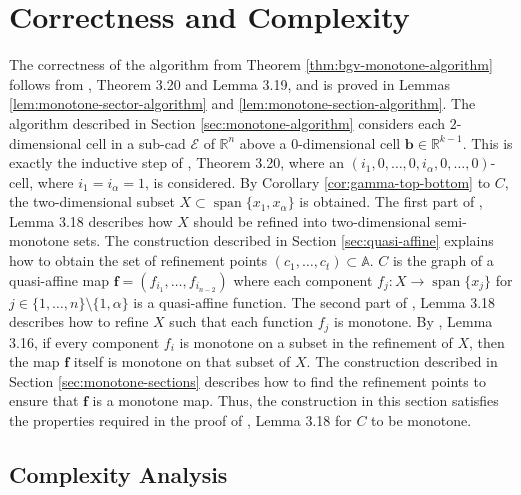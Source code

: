 \documentclass[
]{book}
\theoremstyle{definition}
\theoremstyle{definition}
\theoremstyle{definition}
\theoremstyle{definition}
\theoremstyle{remark}
\begin{document}
\hypertarget{correctness-and-complexity-1}{%
\section{Correctness and Complexity}\label{correctness-and-complexity-1}}

The correctness of the algorithm from Theorem \ref{thm:bgv-monotone-algorithm} follows from \citet{bgv15}, Theorem 3.20 and
Lemma 3.19, and is proved in Lemmas \ref{lem:monotone-sector-algorithm} and \ref{lem:monotone-section-algorithm}.
The algorithm described in Section \ref{sec:monotone-algorithm} considers each \(2\)-dimensional cell in a sub-cad \(\mathcal{E}\) of \(\mathbb{R}^n\) above a \(0\)-dimensional cell \(\mathbf{b} \in \mathbb{R}^{k-1}\). This is exactly the inductive step of \citet{bgv15}, Theorem 3.20, where an \((i_1,0,\ldots,0,i_{\alpha},0,\ldots,0)\)-cell, where \(i_1 = i_\alpha = 1\), is considered.
By Corollary \ref{cor:gamma-top-bottom} to \(C\), the two-dimensional subset \(X \subset {\operatorname{span} \{x_1,x_\alpha\}}\) is obtained. The first part of \citet{bgv15}, Lemma 3.18 describes how \(X\) should be refined into two-dimensional semi-monotone sets. The construction described in Section \ref{sec:quasi-affine} explains how to obtain the set of refinement points \((c_1,\ldots,c_t) \subset \mathbb{A}\).
\(C\) is the graph of a quasi-affine map \(\mathbf{f} = (f_{i_1},\ldots,f_{i_{n-2}})\) where each component \(f_j : X \to {\operatorname{span} \{x_j\}}\) for \(j \in \{1,\ldots,n\} \setminus \{1,\alpha\}\) is a quasi-affine function. The second part of \citet{bgv15}, Lemma 3.18 describes how to refine \(X\) such that each function \(f_j\) is monotone. By \citet{bgv15}, Lemma 3.16, if every component \(f_i\) is monotone on a subset in the refinement of \(X\), then the map \(\mathbf{f}\) itself is monotone on that subset of \(X\).
The construction described in Section \ref{sec:monotone-sections} describes how to find the refinement points to ensure that \(\mathbf{f}\) is a monotone map.
Thus, the construction in this section satisfies the properties required in the proof of \citet{bgv15}, Lemma 3.18 for \(C\) to be monotone.

\hypertarget{sec:monotone-complexity}{%
\subsection{Complexity Analysis}\label{sec:monotone-complexity}}
\end{document}
